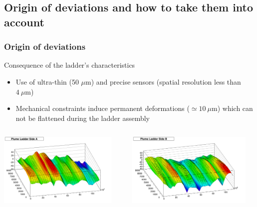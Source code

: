 \documentclass{beamer}
\begin{document}
\subsection{Origin of deviations and how to take them into account}
\begin{frame}
  \frametitle{Origin of deviations}

  \vspace{-0.2cm}
  \begin{block}{Consequence of the ladder's characteristics}
    \begin{itemize}
      \item Use of ultra-thin (50 $\mu\text{m}$) and precise sensors (spatial resolution less than $4~\mu\text{m}$)
      \item Mechanical constraints induce permanent deformations ($\simeq 10~\mu\text{m}$) which can not be flattened during the ladder assembly
    \end{itemize}
  \end{block}

  \vspace{-0.2cm}

  \vspace{-0.3cm}
  \begin{columns}[c]
    \begin{column}{6cm}
      \begin{center}
        \includegraphics[width = 5.7cm]{Pictures/SideAPlumeLadder2010_M20.png}
      \end{center}
    \end{column}

    \begin{column}{6cm}
      \begin{center}
        \includegraphics[width = 6cm]{Pictures/SideBPlumeLadder2010_M20.png}
      \end{center}
    \end{column}
  \end{columns}

\end{frame}
\end{document}
